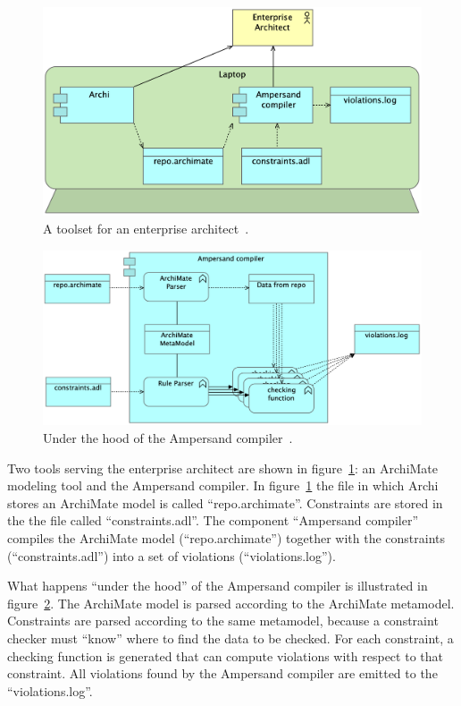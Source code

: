 \documentclass[sn-vancouver]{sn-jnl}%
\theoremstyle{thmstyleone}%
\theoremstyle{thmstyletwo}%
\theoremstyle{thmstylethree}%
\begin{document}
%
\begin{figure}[hbtp]
 \centering
\includegraphics[clip=true, scale=0.19]{Figure4}
\caption{A toolset for an enterprise architect~\cite{iceis22}.}
\label{fig2}   %
\end{figure}
\begin{figure}[hbtp]
 \centering
\includegraphics[clip=true, scale=0.16]{Figure5}
\caption{Under the hood of the Ampersand compiler~\cite{iceis22}.}
\label{fig3}
\end{figure}

Two tools serving the enterprise architect are shown in figure~\ref{fig2}: an ArchiMate modeling tool and the Ampersand compiler.
In figure~\ref{fig2} the file in which Archi stores an ArchiMate model is called ``repo.archimate''.
Constraints are stored in the the file called ``constraints.adl''.
The component ``Ampersand compiler'' compiles the ArchiMate model (``repo.archimate'') together with the constraints (``constraints.adl'') into a set of violations (``violations.log'').

What happens ``under the hood'' of the Ampersand compiler is illustrated in figure~\ref{fig3}.
The ArchiMate model is parsed according to the ArchiMate metamodel.
Constraints are parsed according to the same metamodel, because a constraint checker must ``know'' where to find the data to be checked.
For each constraint, a checking function is generated that can compute violations with respect to that constraint.
All violations found by the Ampersand compiler are emitted to the ``violations.log''.
\end{document}
